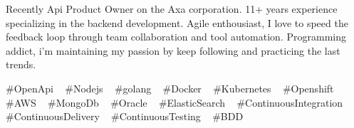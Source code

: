 

\begin{cvparagraph}

Recently Api Product Owner on the Axa corporation. 11+ years experience specializing in the backend development. Agile enthousiast, I love to speed the feedback loop through team collaboration and tool automation. Programming addict, i'm maintaining my passion by keep following and practicing the last trends.
\end{cvparagraph}
\begin{cvtechnologies}
 \#OpenApi ~
 \#Nodejs ~
 \#golang ~
 \#Docker ~
 \#Kubernetes ~
 \#Openshift ~
 \#AWS ~
 \#MongoDb ~
 \#Oracle ~
 \#ElasticSearch ~
 \#ContinuousIntegration ~
 \#ContinuousDelivery ~
 \#ContinuousTesting ~
 \#BDD 
\end{cvtechnologies}
